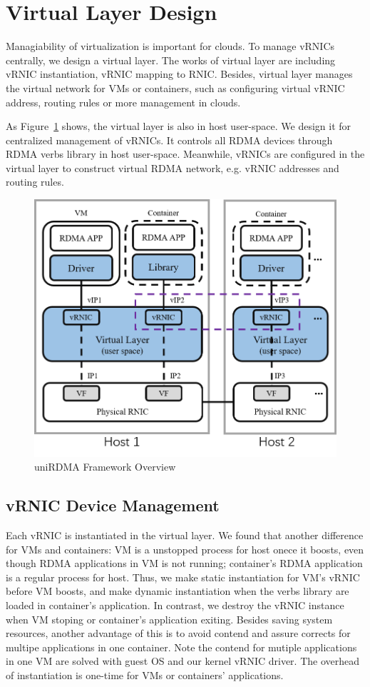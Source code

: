 \section{Virtual Layer Design}
Managiability of virtualization is important for clouds. To manage vRNICs centrally, we design a virtual layer. The works of virtual layer are including vRNIC instantiation, vRNIC mapping to RNIC. Besides, virtual layer manages the virtual network for VMs or containers, such as configuring virtual vRNIC address, routing rules or more management in clouds.

As Figure~\ref{fig:framework-overview} shows, the virtual layer is also in host user-space. We design it for centralized management of vRNICs. It controls all RDMA devices through RDMA verbs library in host user-space. Meanwhile, vRNICs are configured in the virtual layer to construct virtual RDMA network, e.g. vRNIC addresses and routing rules.

\begin{figure}[!ht]
	\centering
	\includegraphics[width=0.9\linewidth]{images/framework-overview.png}
	\caption{uniRDMA Framework Overview}
	\label{fig:framework-overview}
\end{figure}

\subsection{vRNIC Device Management}
Each vRNIC is instantiated in the virtual layer. We found that another difference for VMs and containers: VM is a unstopped process for host onece it boosts, even though RDMA applications in VM is not running; container's RDMA application is a regular process for host. Thus, we make static instantiation for VM's vRNIC before VM boosts, and make dynamic instantiation when the verbs library are loaded in container's application. In contrast, we destroy the vRNIC instance when VM stoping or container's application exiting. Besides saving system resources, another advantage of this is to avoid contend and assure corrects for multipe applications in one container. Note the contend for mutiple applications in one VM are solved with guest OS and our kernel vRNIC driver. The overhead of instantiation is one-time for VMs or containers' applications.

